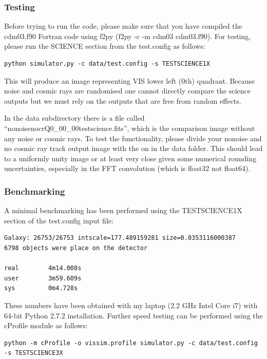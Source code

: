 \documentclass[a4paper,12pt,english]{sphinxmanual}
\begin{document}
\subsubsection{Testing}
\label{simulator:testing}
Before trying to run the code, please make sure that you have compiled the
cdm03.f90 Fortran code using f2py (f2py -c -m cdm03 cdm03.f90). For testing,
please run the SCIENCE section from the test.config as follows:

\begin{Verbatim}[commandchars=\\\{\}]
python simulator.py -c data/test.config -s TESTSCIENCE1X
\end{Verbatim}

This will produce an image representing VIS lower left (0th) quadrant. Because
noise and cosmic rays are randomised one cannot directly compare the science
outputs but we must rely on the outputs that are free from random effects.

In the data subdirectory there is a file called ``nonoisenocrQ0\_00\_00testscience.fits'',
which is the comparison image without any noise or cosmic rays. To test the functionality,
please divide your nonoise and no cosmic ray track output image with the on in the data
folder. This should lead to a uniformly unity image or at least very close given some
numerical rounding uncertainties, especially in the FFT convolution (which is float32 not
float64).


\subsubsection{Benchmarking}
\label{simulator:benchmarking}
A minimal benchmarking has been performed using the TESTSCIENCE1X section of the test.config input file:

\begin{Verbatim}[commandchars=\\\{\}]
Galaxy: 26753/26753 intscale=177.489159281 size=0.0353116000387
6798 objects were place on the detector

real        4m14.008s
user        3m59.609s
sys         0m4.728s
\end{Verbatim}

These numbers have been obtained with my laptop (2.2 GHz Intel Core i7) with
64-bit Python 2.7.2 installation. Further speed testing can be performed using the cProfile module
as follows:

\begin{Verbatim}[commandchars=\\\{\}]
python -m cProfile -o vissim.profile simulator.py -c data/test.config -s TESTSCIENCE3X
\end{Verbatim}
\end{document}
